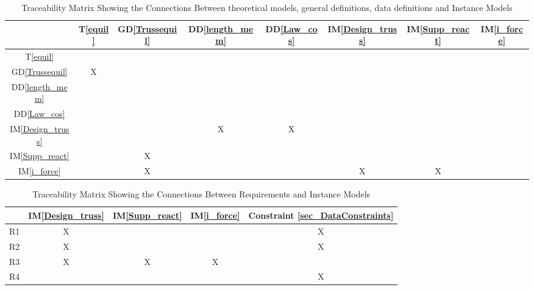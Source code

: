 \documentclass[12pt]{article}
\newcommand{\dref}[1]{GD\ref{#1}}
\newcommand{\ddref}[1]{DD\ref{#1}}
\newcommand{\tref}[1]{T\ref{#1}}
\newcommand{\iref}[1]{IM\ref{#1}}
\begin{document}
\begin{table}[h!]
\centering
\begin{tabular}{|c|c|c|c|c|c|c|c|}
\hline
	& \tref{equil} & \dref{Trussequil}& \ddref{length_mem}  
  & \ddref{Law_cos} &\iref{Design_truss}& \iref{Supp_react}& 
	\iref{i_force}  \\
\hline
\tref{equil}       & & & & & & &\\ \hline
\dref{Trussequil}    &X & & & & & &\\ \hline
\ddref{length_mem}    & & & & & & &\\ \hline
\ddref{Law_cos}       & & & & & & &\\ \hline
\iref{Design_truss} & & &X &X & & &\\ \hline 
\iref{Supp_react} & &X & & & & &\\ \hline 
\iref{i_force} & &X & & &X &X &\\ \hline 
\end{tabular}
\caption{Traceability Matrix Showing the Connections Between  theoretical models, general definitions,
data definitions and Instance Models}
\label{Table:trace}
\end{table}
\begin{table}[h!]
\centering
\begin{tabular}{|c|c|c|c|c|}
\hline
	& \iref{Design_truss}& \iref{Supp_react}& 
	\iref{i_force}& Constraint \ref{sec_DataConstraints}  \\
\hline
R1      &X & & &X\\ \hline
R2    &X & &  &X\\ \hline
R3    &X &X &X&\\ \hline
R4       & & & &X\\ \hline
\end{tabular}
\caption{Traceability Matrix Showing the Connections Between Requirements and Instance Models}
\label{Table:R_trace}
\end{table}
\end{document}
